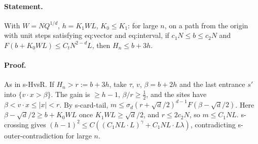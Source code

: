 \paragraph{Statement.} With $W=NQ^{1/d}$, $h=K_1WL$, $K_0\leq K_1$: for large $n$, on a path from the origin with unit steps satisfying eq:vector and eq:interval, if
$c_1N\leq b\leq c_2N$ and $F(b+K_0WL)\leq C_tN^{2-d}L$, then $H_n\leq b+3h$.
\paragraph{Proof.} As in s-HvsR. If $H_n>r:=b+3h$, take $\tau$, $v$, $\beta=b+2h$ and the last entrance $s'$ into $\{v\cdot x>\beta\}$. The gain is $\geq h-1$,
$\beta/r\geq\frac12$, and the sites have $\beta<v\cdot x\leq|x|<r$. By s-card-tail, $m\leq\sigma_d(r+\sqrt d/2)^{d-1}F(\beta-\sqrt d/2)$. Here
$\beta-\sqrt d/2\geq b+K_0WL$ once $K_1WL\geq\sqrt d/2$, and $r\leq2c_2N$, so $m\leq C_1NL$. s-crossing gives
$(h-1)^2\leq C((C_1NL\cdot L)^\gamma+C_1NL\cdot L\lambda)$, contradicting s-outer-contradiction for large $n$.
